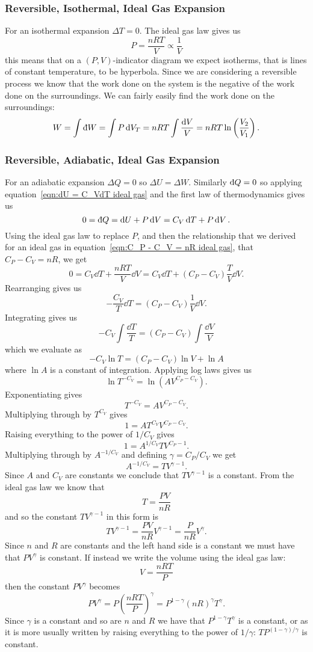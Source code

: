 \documentclass[a4paper]{article}
\newcommand{\ddbar}[1]{\text{\dj}{#1}}
\begin{document}
    \subsubsection{Reversible, Isothermal, Ideal Gas Expansion}
    For an isothermal expansion \(\Delta T = 0\).
    The ideal gas law gives us
    \[P = \frac{nRT}{V} \propto \frac{1}{V}\]
    this means that on a \((P, V)\)-indicator diagram we expect isotherms, that is lines of constant temperature, to be hyperbola.
    Since we are considering a reversible process we know that the work done on the system is the negative of the work done on the surroundings.
    We can fairly easily find the work done on the surroundings:
    \[W = \int\ddbar{W} = \int P\dd{V_T} = nRT\int\frac{\dd{V}}{V} = nRT\ln\left(\frac{V_2}{V_1}\right).\]
    
    \subsubsection{Reversible, Adiabatic, Ideal Gas Expansion}
    For an adiabatic expansion \(\Delta Q = 0\) so \(\Delta U = \Delta W\).
    Similarly \(\ddbar{Q} = 0\) so applying equation~\ref{eqn:dU = C_VdT ideal gas} and the first law of thermodynamics gives us
    \[0 = \ddbar{Q} = \dd{U} + P\dd{V} = C_V\dd{T} + P\dd{V}.\]
    Using the ideal gas law to replace \(P\), and then the relationship that we derived for an ideal gas in equation~\ref{eqn:C_P - C_V = nR ideal gas}, that \(C_P - C_V = nR\), we get
    \[0 = C_V\dd{T} + \frac{nRT}{V}\dd{V} = C_V\dd{T} + (C_P - C_V)\frac{T}{V}\dd{V}.\]
    Rearranging gives us
    \[-\frac{C_V}{T}\dd{T} = (C_P - C_V)\frac{1}{V}\dd{V}.\]
    Integrating gives us
    \[-C_V\int\frac{\dd{T}}{T} = (C_P - C_V)\int\frac{\dd{V}}{V}\]
    which we evaluate as
    \[-C_V\ln T = (C_P - C_V)\ln V + \ln A\]
    where \(\ln A\) is a constant of integration.
    Applying log laws gives us
    \[\ln T^{-C_V} = \ln \left(AV^{C_P - C_V}\right).\]
    Exponentiating gives
    \[T^{-C_V} = AV^{C_P - C_V}.\]
    Multiplying through by \(T^{C_V}\) gives
    \[1 = AT^{C_V}V^{C_P - C_V}.\]
    Raising everything to the power of \(1/C_V\) gives
    \[1 = A^{1/C_V}TV^{C_P - 1}.\]
    Multiplying through by \(A^{-1/C_V}\) and defining \(\gamma = C_P/C_V\) we get
    \[A^{-1/C_V} = TV^{\gamma - 1}.\]
    Since \(A\) and \(C_V\) are constants we conclude that \(TV^{\gamma - 1}\) is a constant.
    From the ideal gas law we know that
    \[T = \frac{PV}{nR}\]
    and so the constant \(TV^{\gamma - 1}\) in this form is
    \[TV^{\gamma - 1} = \frac{PV}{nR}V^{\gamma - 1} = \frac{P}{nR}V^\gamma.\]
    Since \(n\) and \(R\) are constants and the left hand side is a constant we must have that \(PV^\gamma\) is constant.
    If instead we write the volume using the ideal gas law:
    \[V = \frac{nRT}{P}\]
    then the constant \(PV^\gamma\) becomes
    \[PV^\gamma = P\left(\frac{nRT}{P}\right)^\gamma = P^{1 - \gamma}(nR)^\gamma T^\gamma.\]
    Since \(\gamma\) is a constant and so are \(n\) and \(R\) we have that \(P^{1-\gamma}T^\gamma\) is a constant, or as it is more usually written by raising everything to the power of \(1/\gamma\): \(TP^{(1 - \gamma)/\gamma}\) is constant.
    
\end{document}
